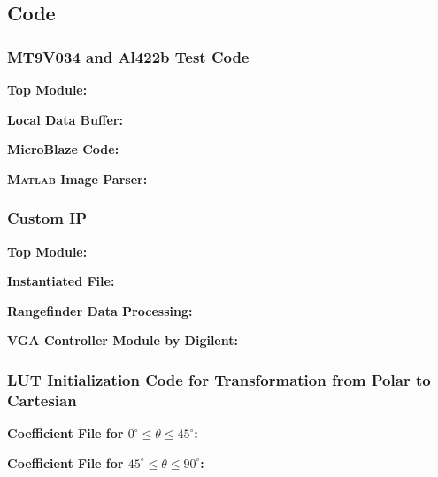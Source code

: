 \subsection{Code}

\subsubsection{MT9V034 and Al422b Test Code} \label{mt9v034TestCode}
\textbf{Top Module:}
\singlespacing

\doublespacing
\par
\textbf{Local Data Buffer:}
\singlespacing

\doublespacing
\par
\textbf{MicroBlaze Code:}
\label{camTestC}
\singlespacing

\doublespacing
\par
\textbf{\textsc{Matlab} Image Parser:}
\label{camTestMatlab}
\singlespacing

\doublespacing

\newpage

\subsubsection{Custom IP} 
\textbf{Top Module:} \label{customIPtop}
\singlespacing

\doublespacing

\par
\textbf{Instantiated File:} \label{customIPaxi}
\singlespacing

\doublespacing

\par
\textbf{Rangefinder Data Processing:} \label{rangefinderDP}
\singlespacing

\doublespacing

\par
\textbf{VGA Controller Module by Digilent:} \label{vga_controller}
\singlespacing

\doublespacing

\newpage

\subsubsection{LUT Initialization Code for Transformation from Polar to Cartesian} \label{coe_file}
\textbf{Coefficient File for $0^\circ{}\leq{}\theta{}\leq45^\circ$:}
\singlespacing

\doublespacing
\par
\textbf{Coefficient File for $45^\circ{}\leq{}\theta{}\leq90^\circ$:}
\singlespacing

\doublespacing


